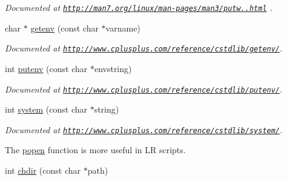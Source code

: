 \begin{DoxyCompactItemize}
\begin{DoxyCompactList}\small\item\em Documented at \href{http://man7.org/linux/man-pages/man3/putw.3.html}{\tt http\-://man7.\-org/linux/man-\/pages/man3/putw..\-html} . \end{DoxyCompactList}\item 
\hypertarget{group__process_gafb7a8c40cb25ca269dce667a8e2a7668}{char $\ast$ \hyperlink{group__process_gafb7a8c40cb25ca269dce667a8e2a7668}{getenv} (const char $\ast$varname)}\label{group__process_gafb7a8c40cb25ca269dce667a8e2a7668}

\begin{DoxyCompactList}\small\item\em Documented at \href{http://www.cplusplus.com/reference/cstdlib/getenv/}{\tt http\-://www.\-cplusplus.\-com/reference/cstdlib/getenv/}. \end{DoxyCompactList}\item 
\hypertarget{group__process_gaebed10bce76fcc4adf43ada5a3e21300}{int \hyperlink{group__process_gaebed10bce76fcc4adf43ada5a3e21300}{putenv} (const char $\ast$envstring)}\label{group__process_gaebed10bce76fcc4adf43ada5a3e21300}

\begin{DoxyCompactList}\small\item\em Documented at \href{http://www.cplusplus.com/reference/cstdlib/putenv/}{\tt http\-://www.\-cplusplus.\-com/reference/cstdlib/putenv/}. \end{DoxyCompactList}\item 
\hypertarget{group__process_ga8b0abd498c08f782b325e8532254e962}{int \hyperlink{group__process_ga8b0abd498c08f782b325e8532254e962}{system} (const char $\ast$string)}\label{group__process_ga8b0abd498c08f782b325e8532254e962}

\begin{DoxyCompactList}\small\item\em Documented at \href{http://www.cplusplus.com/reference/cstdlib/system/}{\tt http\-://www.\-cplusplus.\-com/reference/cstdlib/system/}. \par
 The \hyperlink{group__process_ga977bb639528d6aab8d0ce9afd57ec289}{popen} function is more useful in L\-R scripts. \end{DoxyCompactList}\item 
\hypertarget{group__process_ga03af571dfb595681bfa203c83385c07b}{int \hyperlink{group__process_ga03af571dfb595681bfa203c83385c07b}{chdir} (const char $\ast$path)}\label{group__process_ga03af571dfb595681bfa203c83385c07b}


\end{DoxyCompactItemize}
